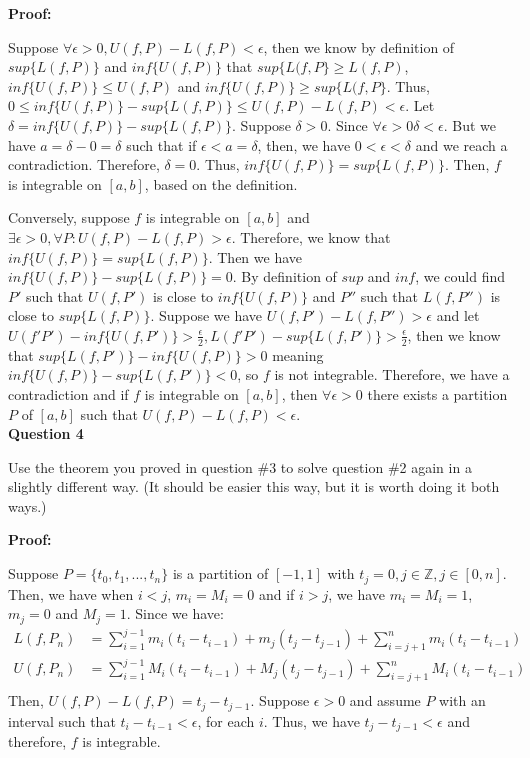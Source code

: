 \documentclass[a4paper,12pt]{report}
\begin{document}
\noindent
\textbf{Proof: }

\noindent
Suppose $\forall \epsilon > 0, U(f,P)-L(f,P)<\epsilon $, then we know by definition of $sup\{L(f,P)\}$ and $inf\{U(f,P)\}$ that $sup\{L(f,P\}\geq L(f,P)$, $inf\{U(f,P)\}\leq U(f,P)$ and $inf\{U(f,P)\}\geq sup\{L(f,P\}$. Thus, $0\leq inf\{U(f,P)\}-sup\{L(f,P)\}\leq U(f,P)-L(f,P)<\epsilon$. Let $\delta=inf\{U(f,P)\}-sup\{L(f,P)\}$. Suppose $\delta > 0$. Since $\forall \epsilon>0 \delta<\epsilon$. But we have $a=\delta-0=\delta$ such that if $\epsilon<a=\delta$, then, we have $0<\epsilon<\delta$ and we reach a contradiction. Therefore, $\delta=0$. Thus, $inf\{U(f,P)\} = sup\{L(f,P)\}$. Then, $f$ is integrable on $[a,b]$, based on the definition. 

\noindent
Conversely, suppose $f$ is integrable on $[a,b]$ and $\exists \epsilon>0, \forall P: U(f,P)-L(f,P)>\epsilon$. Therefore, we know that $inf\{U(f,P)\} = sup\{L(f,P)\}$. Then we have $inf\{U(f,P)\}-sup\{L(f,P)\}=0$. By definition of $sup$ and $inf$, we could find $P'$ such that $U(f,P')$ is close to $inf\{U(f,P)\}$ and $P''$ such that $L(f,P'')$ is close to $sup\{L(f,P)\}$. Suppose we have $U(f,P')-L(f,P'')>\epsilon$ and let $U(f'P')-inf\{U(f,P')\}>\frac{\epsilon}{2}, L(f'P')-sup\{L(f,P')\}>\frac{\epsilon}{2}$, then we know that $sup\{L(f,P')\}-inf\{U(f,P)\}>0$ meaning $inf\{U(f,P)\}-sup\{L(f,P')\}<0$, so $f$ is not integrable. Therefore, we have a contradiction and if $f$ is integrable on $[a,b]$, then $\forall \epsilon >0$ there
exists a partition $P$ of $[a,b]$ such
that
$
U(f,P)-L(f,P)<\epsilon.
$\\

\noindent
\textbf{Question 4}

\noindent
Use the theorem you proved in 
question \#3 to solve 
question \#2 again 
in a slightly different way. (It 
should be easier this way, but it is
worth doing it both ways.)

\noindent
\textbf{Proof: }

\noindent
Suppose $P=\{t_0,t_1,...,t_n\}$ is a partition of $[-1,1]$ with $t_j = 0, j \in \mathbb{Z}, j \in [0,n]$. Then, we have when $i<j$, $m_i=M_i=0$ and if $i>j$, we have $m_i=M_i=1$, $m_j=0$ and $M_j=1$. Since we have:
\begin{align*}
L(f,P_n)&=\sum_{i=1}^{j-1}m_i(t_i-t_{i-1})+m_j(t_j-t_{j-1})+\sum_{i=j+1}^{n}m_i(t_i-t_{i-1})\\
U(f,P_n)&=\sum_{i=1}^{j-1}M_i(t_i-t_{i-1})+M_j(t_j-t_{j-1})+\sum_{i=j+1}^{n}M_i(t_i-t_{i-1})\\
\end{align*}
Then, $U(f,P)-L(f,P)=t_j-t_{j-1}$. Suppose $\epsilon >0$ and assume $P$ with an interval such that $t_i-t_{i-1}<\epsilon$, for each $i$. Thus, we have $t_j-t_{j-1}<\epsilon$ and therefore, $f$ is integrable. \\
\end{document}
